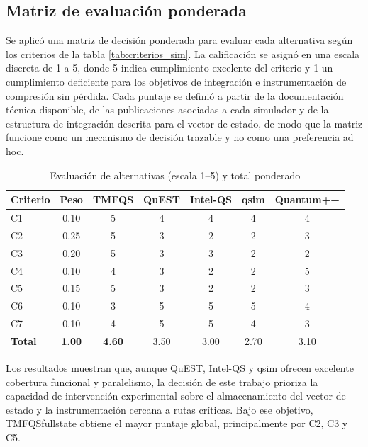 \subsection{Matriz de evaluación ponderada}

Se aplicó una matriz de decisión ponderada para evaluar cada alternativa según los criterios de la tabla \ref{tab:criterios_sim}. La calificación se asignó en una escala discreta de 1 a 5, donde 5 indica cumplimiento excelente del criterio y 1 un cumplimiento deficiente para los objetivos de integración e instrumentación de compresión sin pérdida. Cada puntaje se definió a partir de la documentación técnica disponible, de las publicaciones asociadas a cada simulador y de la estructura de integración descrita para el vector de estado, de modo que la matriz funcione como un mecanismo de decisión trazable y no como una preferencia ad hoc.

\begin{table}[H]
\centering
\caption{Evaluación de alternativas (escala 1--5) y total ponderado} \label{tab:evaluacion_sim}
\begin{tabular}{lcccccc}
\hline
\multicolumn{1}{c}{\textbf{Criterio}} &
\textbf{Peso} &
\textbf{TMFQS} &
\textbf{QuEST} &
\textbf{Intel-QS} &
\textbf{qsim} &
\textbf{Quantum++} \\
\hline
C1 & 0.10 & 5 & 4 & 4 & 4 & 4 \\
C2 & 0.25 & 5 & 3 & 2 & 2 & 3 \\
C3 & 0.20 & 5 & 3 & 3 & 2 & 2 \\
C4 & 0.10 & 4 & 3 & 2 & 2 & 5 \\
C5 & 0.15 & 5 & 3 & 2 & 2 & 3 \\
C6 & 0.10 & 3 & 5 & 5 & 5 & 4 \\
C7 & 0.10 & 4 & 5 & 5 & 4 & 3 \\
\hline
\textbf{Total} & \textbf{1.00} &
\textbf{4.60} & 3.50 & 3.00 & 2.70 & 3.10 \\
\hline
\end{tabular}
\end{table}

Los resultados muestran que, aunque QuEST, Intel-QS y qsim ofrecen excelente cobertura funcional y paralelismo, la decisión de este trabajo prioriza la capacidad de intervención experimental sobre el almacenamiento del vector de estado y la instrumentación cercana a rutas críticas. Bajo ese objetivo, TMFQSfullstate obtiene el mayor puntaje global, principalmente por C2, C3 y C5.
